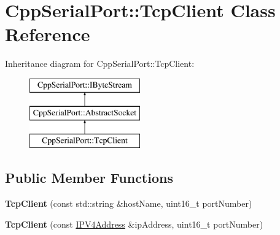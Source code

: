 \hypertarget{class_cpp_serial_port_1_1_tcp_client}{}\section{Cpp\+Serial\+Port\+:\+:Tcp\+Client Class Reference}
\label{class_cpp_serial_port_1_1_tcp_client}
Inheritance diagram for Cpp\+Serial\+Port\+:\+:Tcp\+Client\+:\begin{figure}[H]
\begin{center}
\leavevmode
\includegraphics[height=3.000000cm]{class_cpp_serial_port_1_1_tcp_client}
\end{center}
\end{figure}
\subsection*{Public Member Functions}
\begin{DoxyCompactItemize}
\item 
\mbox{\label{class_cpp_serial_port_1_1_tcp_client_af0919ce0261dcb67d8d23ba25f052a00}} 
{\bfseries Tcp\+Client} (const std\+::string \&host\+Name, uint16\+\_\+t port\+Number)
\item 
\mbox{\label{class_cpp_serial_port_1_1_tcp_client_a98ff90e57b266dcd1416da536ad0e317}} 
{\bfseries Tcp\+Client} (const \mbox{\hyperlink{class_cpp_serial_port_1_1_i_p_v4_address}{I\+P\+V4\+Address}} \&ip\+Address, uint16\+\_\+t port\+Number)
\end{DoxyCompactItemize}
